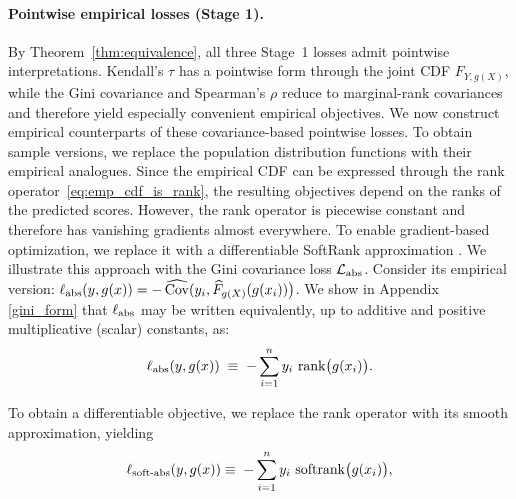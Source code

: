 \documentclass[11pt]{article}
\theoremstyle{plain}
\theoremstyle{plain}
\theoremstyle{plain}
\theoremstyle{plain}
\theoremstyle{plain}
\theoremstyle{plain}
\theoremstyle{plain}
\newenvironment{addedblock}{\begingroup\color{cairoaddedgreen}}{\endgroup}
\begin{document}
 
 


\begin{addedblock}
\paragraph{Pointwise empirical losses (Stage 1).}  By Theorem~\ref{thm:equivalence}, all three Stage~1 losses admit pointwise interpretations. Kendall's $\tau$ has a pointwise form through the joint CDF $F_{Y,g(X)}$, while the Gini covariance and Spearman's $\rho$ reduce to marginal-rank covariances and therefore yield especially convenient empirical objectives. We now construct empirical counterparts of these covariance-based pointwise losses. To obtain sample versions, we replace the population distribution functions with their empirical analogues. Since the empirical CDF can be expressed through the rank operator~\eqref{eq:emp_cdf_is_rank}, the resulting objectives depend on the ranks of the predicted scores. However, the rank operator is piecewise constant and therefore has vanishing gradients almost everywhere. To enable gradient-based optimization, we replace it with a differentiable SoftRank approximation \citep{blondel2020fast,cuturi2019differentiable}.
\end{addedblock}
We illustrate this approach with the Gini covariance loss $\mathcal{L}_{\textup{abs}}$. Consider its empirical version: $\ell_{\textup{abs}}(y, g(x)) = -\,{\widehat{\mathrm{Cov}}}(y_i,\widehat F_{g(X)}(g(x_i))\big)$. We show in Appendix \ref{gini_form} that  $\ell_{\textup{abs}}$ may be written equivalently, up to additive and positive multiplicative (scalar) constants, as:
\begin{equation}
\ell_{\textup{abs}}(y, g(x))
\;\equiv\;
-\sum_{i=1}^n y_i\,\operatorname{rank}\!\big(g(x_i)\big).
\label{eq:rank_form_of_gini_no_constants}
\end{equation}


To obtain a differentiable objective, we replace the rank operator with its smooth approximation, yielding
\begin{equation}
\label{eq: smooth_gini_loss}
        \ell_\textup{soft-abs}(y, g(x))
    \equiv\;-\sum_{i=1}^n y_i\,\operatorname{softrank}\!\big(g(x_i)\big), 
\end{equation}
\end{document}
